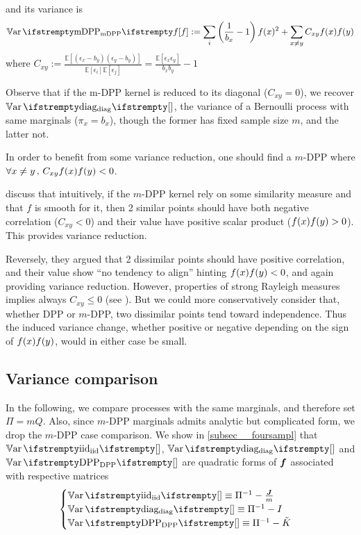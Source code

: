 and its variance is
\begin{equation}
	\Var{\textrm{mDPP}}{\query}:=\sum_{i}\left(\frac{1}{b_x}-1\right) \query(x)^2
	+ \sum_{x \neq y} C_{xy}\query(x) \query(y)
\end{equation}
where $C_{xy}:=\frac{\mathbb{E}\left[\left(\epsilon_{x}-b_{y}\right)\left(\epsilon_{y}-b_{y}\right)\right]}{\mathbb{E}\left[\epsilon_{i}\right] \mathbb{E}\left[\epsilon_{j}\right]}=\frac{\mathbb{E}\left[\epsilon_{x} \epsilon_{y}\right]}{b_{x} b_{y}}-1
$

Observe that if the m-DPP kernel is reduced to its diagonal ($C_{xy} = 0$), we recover $\Var{\textrm{diag}}{}$, the variance of a Bernoulli process with same marginals ($\pi_x = b_x$), though the former has fixed sample size $m$, and the latter not.

In order to benefit from some variance reduction, one should find a $m$-DPP where $\forall x\neq y \,,\, C_{xy}f(x) f(y) <0$.

\cite{zhang2017dppminibatch} discuss that intuitively, if the $m$-DPP kernel rely on some similarity measure and that $f$ is smooth for it, then 2 similar points should have both negative correlation ($C_{xy}<0$) and their value have positive scalar product ($f(x) f(y) > 0$). This provides variance reduction.

Reversely, they argued that 2 dissimilar points should have positive correlation, and their value show ``no tendency to align'' hinting $f(x) f(y) < 0$, and again providing variance reduction. However, properties of strong Rayleigh measures implies always $C_{xy}\leq0$ (see \cite{pemantle2011rayleighconcentration}). But we could more conservatively consider that, whether DPP or $m$-DPP, two dissimilar points tend toward independence. Thus the induced variance change, whether positive or negative depending on the sign of $f(x) f(y)$, would in either case be small. 



\subsection{Variance comparison}
In the following, we compare processes with the same marginals, and therefore set $\Pi = mQ$. Also, 
since $m$-DPP marginals admits analytic but complicated form, we drop the $m$-DPP case comparison. We show in \cref{subsec__foursampl} that $\Var{\textrm{iid}}{}$, $\Var{\textrm{diag}}{}$ and $\Var{\textrm{DPP}}{}$ are quadratic forms of $\boldsymbol{f}$ associated with respective matrices
$$\begin{cases}
	\Var{\textrm{iid}}{} \equiv \Pi^{-1} - \frac{\moones}{m} \\
	\Var{\textrm{diag}}{} \equiv \Pi^{-1} - I \\
	\Var{\textrm{DPP}}{} \equiv \Pi^{-1} - \tilde K
\end{cases}$$

